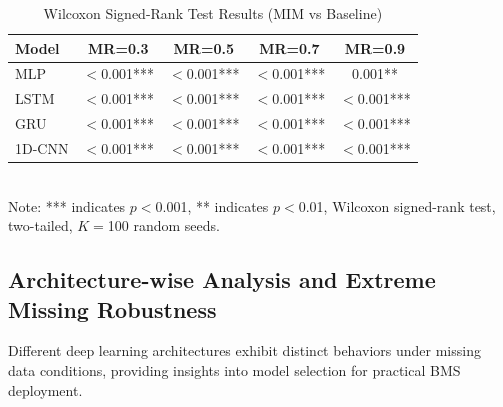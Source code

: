 \documentclass[5p,times]{elsarticle}
\begin{document}
\begin{table}[t]
\centering
\caption{Summary of MAE Improvement Rates of MIM vs Baseline (\%)}
\label{tab:improvement_summary}
\end{table}

\begin{table}[t]
\centering
\small
\caption{Wilcoxon Signed-Rank Test Results (MIM vs Baseline)}
\label{tab:significance}
\begin{tabular}{@{}lcccc@{}}
\toprule
\textbf{Model} & \textbf{MR=0.3} & \textbf{MR=0.5} & \textbf{MR=0.7} & \textbf{MR=0.9} \\
\midrule
MLP & $<$0.001*** & $<$0.001*** & $<$0.001*** & 0.001** \\
LSTM & $<$0.001*** & $<$0.001*** & $<$0.001*** & $<$0.001*** \\
GRU & $<$0.001*** & $<$0.001*** & $<$0.001*** & $<$0.001*** \\
1D-CNN & $<$0.001*** & $<$0.001*** & $<$0.001*** & $<$0.001*** \\
\bottomrule
\end{tabular}
\\[3pt]
\footnotesize Note: *** indicates $p<$0.001, ** indicates $p<$0.01, Wilcoxon signed-rank test, two-tailed, $K=$100 random seeds.
\end{table}

\subsection{Architecture-wise Analysis and Extreme Missing Robustness}\label{sec:architecture}

Different deep learning architectures exhibit distinct behaviors under missing data conditions, providing insights into model selection for practical BMS deployment.
\end{document}
